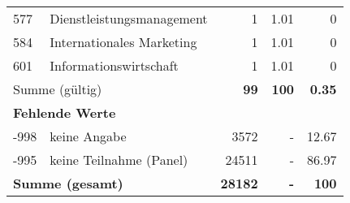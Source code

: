 \begin{longtable}{lXrrr}
        577 & \multicolumn{1}{X}{Dienstleistungsmanagement} & %
          \num{1} &
          \num[round-mode=places,round-precision=2]{1,01} &
          \num[round-mode=places,round-precision=2]{0} \\

        584 & \multicolumn{1}{X}{Internationales Marketing} & %
          \num{1} &
          \num[round-mode=places,round-precision=2]{1,01} &
          \num[round-mode=places,round-precision=2]{0} \\

        601 & \multicolumn{1}{X}{Informationswirtschaft} & %
          \num{1} &
          \num[round-mode=places,round-precision=2]{1,01} &
          \num[round-mode=places,round-precision=2]{0} \\

     \midrule
     \multicolumn{2}{l}{Summe (gültig)} &
       \textbf{\num{99}} &
     \textbf{100} &
       \textbf{\num[round-mode=places,round-precision=2]{0,35}} \\
     \multicolumn{5}{l}{\textbf{Fehlende Werte}}\\
       -998 &
       keine Angabe &
         \num{3572} &
        - &
         \num[round-mode=places,round-precision=2]{12,67} \\
       -995 &
       keine Teilnahme (Panel) &
         \num{24511} &
        - &
         \num[round-mode=places,round-precision=2]{86,97} \\
     \midrule
     \multicolumn{2}{l}{\textbf{Summe (gesamt)}} &
          \textbf{\num{28182}} &
        \textbf{-} &
        \textbf{100} \\
     \bottomrule
     \end{longtable}
     
